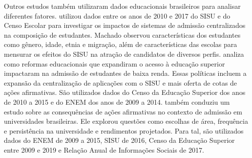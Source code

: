Outros estudos também utilizaram dados educacionais brasileiros para analisar diferentes fatores. \citet{Machado2021} utilizou dados entre os anos de 2010 e 2017 do SISU e do Censo Escolar para investigar os impactos de sistemas de admissão centralizados na composição de estudantes. Machado observou características dos estudantes como gênero, idade, etnia e migração, além de características das escolas para mensurar os efeitos do SISU na atração de candidatos de diversos perfis. \citet{Mello2022} analiza como reformas educacionais que expandiram o acesso à educação superior impactaram na admissão de estudantes de baixa renda. Essas políticas incluem a expansão da centralização de aplicações com o SISU e mais oferta de cotas de ações afirmativas. São utilizados dados do Censo da Educação Superior dos anos de 2010 a 2015 e do ENEM dos anos de 2009 a 2014. \citet{Otero2021} também conduziu um estudo sobre as consequências de ações afirmativas no contexto de admissão em universidades brasileiras. Ele explorou questões como escolhas de área, frequência e persistência na universidade e rendimentos projetados. Para tal, são utilizados dados do ENEM de 2009 a 2015, SISU de 2016, Censo da Educação Superior entre 2009 e 2019 e Relação Anual de Informações Sociais de 2017.




